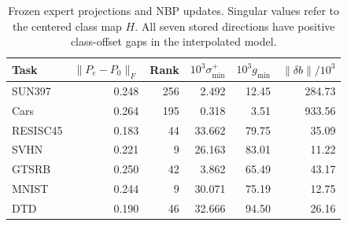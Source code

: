 \begin{table}[!htbp]
\centering
\small
\setlength{\tabcolsep}{2pt}
\caption{Frozen expert projections and NBP updates. Singular values refer to the centered class map $H$. All seven stored directions have positive class-offset gaps in the interpolated model.}
\label{tab:projection-geometry}
\begin{tabular}{lrrrrr}
\toprule
Task & $\|P_e-P_0\|_F$ & Rank & $10^3\sigma_{\min}^{+}$ & $10^3g_{\min}$ & $\|\delta b\|/10^3$ \\
\midrule
SUN397 & 0.248 & 256 & 2.492 & 12.45 & 284.73 \\
Cars & 0.264 & 195 & 0.318 & 3.51 & 933.56 \\
RESISC45 & 0.183 & 44 & 33.662 & 79.75 & 35.09 \\
SVHN & 0.221 & 9 & 26.163 & 83.01 & 11.22 \\
GTSRB & 0.250 & 42 & 3.862 & 65.49 & 43.17 \\
MNIST & 0.244 & 9 & 30.071 & 75.19 & 12.75 \\
DTD & 0.190 & 46 & 32.666 & 94.50 & 26.16 \\
\bottomrule
\end{tabular}
\end{table}
